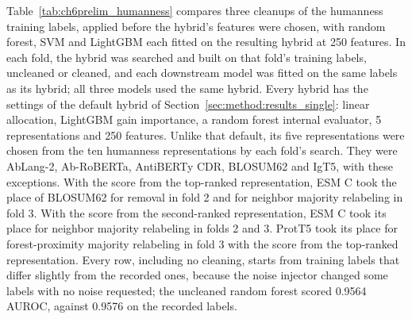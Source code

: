 Table~\ref{tab:ch6prelim_humanness} compares three cleanups of the humanness training labels, applied before the hybrid's features were chosen, with random forest, SVM and LightGBM each fitted on the resulting hybrid at 250 features. In each fold, the hybrid was searched and built on that fold's training labels, uncleaned or cleaned, and each downstream model was fitted on the same labels as its hybrid; all three models used the same hybrid. Every hybrid has the settings of the default hybrid of Section~\ref{sec:method:results_single}: linear allocation, LightGBM gain importance, a random forest internal evaluator, 5 representations and 250 features. Unlike that default, its five representations were chosen from the ten humanness representations by each fold's search. They were AbLang-2, Ab-RoBERTa, AntiBERTy CDR, BLOSUM62 and IgT5, with these exceptions. With the score from the top-ranked representation, ESM C took the place of BLOSUM62 for removal in fold 2 and for neighbor majority relabeling in fold 3. With the score from the second-ranked representation, ESM C took its place for neighbor majority relabeling in folds 2 and 3. ProtT5 took its place for forest-proximity majority relabeling in fold 3 with the score from the top-ranked representation. Every row, including no cleaning, starts from training labels that differ slightly from the recorded ones, because the noise injector changed some labels with no noise requested; the uncleaned random forest scored 0.9564 AUROC, against 0.9576 on the recorded labels.

